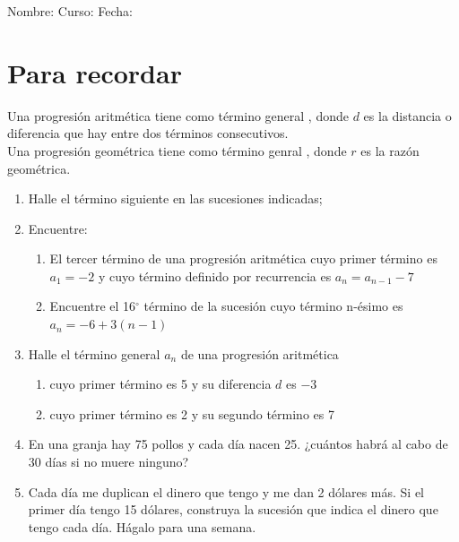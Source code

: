 \documentclass[fleqn]{article}
\newcommand{\LineaNombre}{%
\par
\vspace{\baselineskip}
Nombre:\hrulefill \; Curso: \underline{\hspace*{48pt}} \; Fecha: \underline{\hspace*{2.5cm}} \relax
\par}
\begin{document}
\LineaNombre
\section*{Para recordar}
Una progresi\'on aritmética tiene como término general , donde $d$ es la distancia o diferencia que hay entre dos términos consecutivos.\\

Una progresión geométrica tiene como término genral ,
donde $r$ es la razón geométrica.
\begin{enumerate}
\item Halle el término siguiente en las sucesiones indicadas;
  \begin{enumerate}
\end{enumerate}
\item Encuentre:
  \begin{enumerate}
  \item El tercer término de una progresión aritmética cuyo primer término es $a_1=-2$ y cuyo término definido por recurrencia es $a_n=a_{n-1}-7$ \noanswer[.75in]
  \item Encuentre el 16$^\circ$ término de la sucesión cuyo término n-ésimo es $a_n=-6+3(n-1)$ \noanswer[.75in]
  \end{enumerate}
\newpage
\item Halle el término general $a_{n}$ de una progresión aritmética
\begin{enumerate}
\item cuyo primer término es 5 y su diferencia $d$ es $-3$ \noanswer
\item cuyo primer término es 2 y su segundo término es 7 \noanswer
\end{enumerate}
\item En una granja hay 75 pollos y cada día nacen 25. ¿cuántos habrá al cabo de 30 días si no muere ninguno?\noanswer
\item Cada día me duplican el dinero que tengo y me dan 2 dólares más. Si el primer día tengo 15 dólares, construya la sucesión que indica el dinero que tengo cada día. Hágalo para una semana.\noanswer
\end{enumerate}
\end{document}

